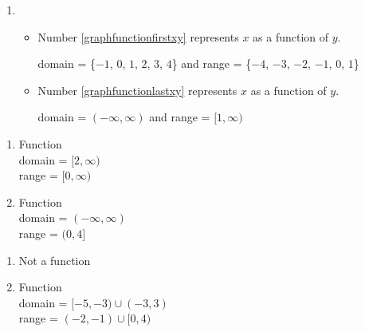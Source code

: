 \begin{enumerate}
\setcounter{enumi}{\value{HW}}

\item  

\begin{itemize}

\item Number \ref{graphfunctionfirstxy} represents $x$ as a function of $y$.

domain  = \{$-1$, $0$, $1$, $2$, $3$, $4$\} and range = \{$-4$, $-3$, $-2$, $-1$, $0$, $1$\}

\item Number \ref{graphfunctionlastxy} represents $x$ as a function of $y$.

domain = $(-\infty, \infty)$  and range = $[1, \infty)$


\end{itemize}

\setcounter{HW}{\value{enumi}}
\end{enumerate}

\begin{multicols}{2}
\begin{enumerate}
\setcounter{enumi}{\value{HW}}

\item Function \\ domain = $[2, \infty)$ \\ range = $[0, \infty)$

\vfill

\columnbreak

\item Function \\ domain = $(-\infty, \infty)$ \\ range = $(0, 4]$

\setcounter{HW}{\value{enumi}}
\end{enumerate}
\end{multicols}


\begin{multicols}{2}
\begin{enumerate}
\setcounter{enumi}{\value{HW}}

\item Not a function


\vfill

\columnbreak

\item Function \\ domain = $[-5,-3) \cup(-3, 3)$ \\ range = $(-2, -1) \cup [0, 4)$

\setcounter{HW}{\value{enumi}}
\end{enumerate}
\end{multicols}

